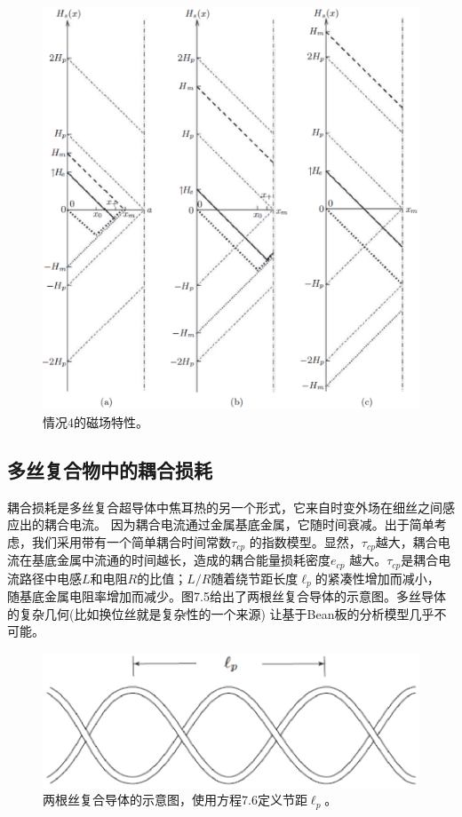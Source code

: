 \begin{figure}[htbp]
	\centering
	\includegraphics[scale=0.7]{chpt7/figs/fig7.4.eps}
	\caption{情况4的磁场特性。}
\end{figure}

\subsection{多丝复合物中的耦合损耗}
耦合损耗是多丝复合超导体中焦耳热的另一个形式，它来自时变外场在细丝之间感应出的耦合电流。
因为耦合电流通过金属基底金属，它随时间衰减。出于简单考虑，我们采用带有一个简单耦合时间常数$\tau_{cp}$
的指数模型。显然，$\tau_{cp}$越大，耦合电流在基底金属中流通的时间越长，造成的耦合能量损耗密度$e_{cp}$
越大。$\tau_{cp}$是耦合电流路径中电感$L$和电阻$R$的比值；$L/R$随着绕节距长度$\ell_p$的紧凑性增加而减小，
随基底金属电阻率增加而减少。图7.5给出了两根丝复合导体的示意图。多丝导体的复杂几何(比如换位丝就是复杂性的一个来源)
让基于Bean板的分析模型几乎不可能。
\begin{figure}[htbp]
	\centering
	\includegraphics[scale=0.6]{chpt7/figs/fig7.5.eps}
	\caption{两根丝复合导体的示意图，使用方程7.6定义节距$\ell_p$。}
\end{figure}

